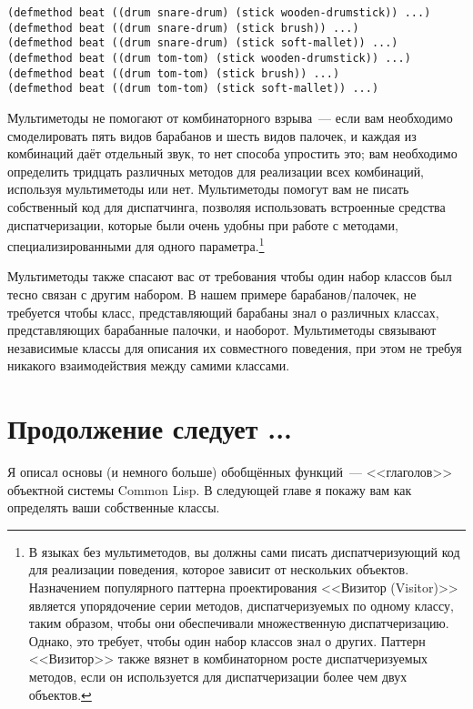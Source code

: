 \begin{lstlisting}
(defmethod beat ((drum snare-drum) (stick wooden-drumstick)) ...)
(defmethod beat ((drum snare-drum) (stick brush)) ...)
(defmethod beat ((drum snare-drum) (stick soft-mallet)) ...)
(defmethod beat ((drum tom-tom) (stick wooden-drumstick)) ...)
(defmethod beat ((drum tom-tom) (stick brush)) ...)
(defmethod beat ((drum tom-tom) (stick soft-mallet)) ...)
\end{lstlisting}

Мультиметоды не помогают от комбинаторного взрыва~--- если вам необходимо смоделировать
пять видов барабанов и шесть видов палочек, и каждая из комбинаций даёт отдельный звук, то
нет способа упростить это; вам необходимо определить тридцать различных методов для
реализации всех комбинаций, используя мультиметоды или нет.  Мультиметоды помогут вам не
писать собственный код для диспатчинга, позволяя использовать встроенные средства
диспатчеризации, которые были очень удобны при работе с методами, специализированными для
одного параметра.\footnote{В языках без мультиметодов, вы должны сами писать
  диспатчеризующий код для реализации поведения, которое зависит от нескольких объектов.
  Назначением популярного паттерна проектирования <<Визитор (Visitor)>> является
  упорядочение серии методов, диспатчеризуемых по одному классу, таким образом, чтобы они
  обеспечивали множественную диспатчеризацию.  Однако, это требует, чтобы один набор
  классов знал о других.  Паттерн <<Визитор>> также вязнет в комбинаторном росте
  диспатчеризуемых методов, если он используется для диспатчеризации более чем двух
  объектов.}

Мультиметоды также спасают вас от требования чтобы один набор классов был тесно связан с
другим набором. В нашем примере барабанов/палочек, не требуется чтобы класс,
представляющий барабаны знал о различных классах, представляющих барабанные палочки, и
наоборот.  Мультиметоды связывают независимые классы для описания их совместного
поведения, при этом не требуя никакого взаимодействия между самими классами.

\section{Продолжение следует ...}

Я описал основы (и немного больше) обобщённых функций~--- <<глаголов>> объектной системы
Common Lisp.  В следующей главе я покажу вам как определять ваши собственные классы.

